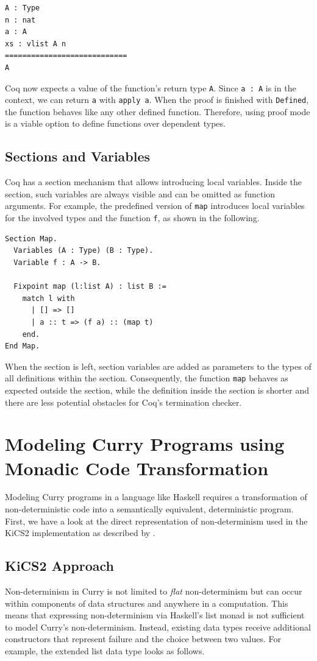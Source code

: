 \documentclass[a4paper, 11pt, fleqn, twoside]{scrreprt}
\newcommand{\cinl}[1]{\texttt{#1}}
\begin{document}
\begin{verbatim}
A : Type
n : nat
a : A
xs : vlist A n
============================
A
\end{verbatim}

Coq now expects a value of the function's return type \cinl{A}.
Since \cinl{a : A} is in the context, we can return \cinl{a} with \cinl{apply a}.
When the proof is finished with \cinl{Defined}, the function behaves like any other defined function.
Therefore, using proof mode is a viable option to define functions over dependent types.

\subsection{Sections and Variables}
Coq has a section mechanism that allows introducing local variables.
Inside the section, such variables are always visible and can be omitted as function arguments.
For example, the predefined version of \cinl{map} introduces local variables for the involved types and the function \cinl{f}, as shown in the following.

\begin{verbatim}
Section Map.
  Variables (A : Type) (B : Type).
  Variable f : A -> B.

  Fixpoint map (l:list A) : list B :=
    match l with
      | [] => []
      | a :: t => (f a) :: (map t)
    end.
End Map.
\end{verbatim}

When the section is left, section variables are added as parameters to the types of all definitions within the section.
Consequently, the function \cinl{map} behaves as expected outside the section, while the definition inside the section is shorter and there are less potential obstacles for Coq's termination checker.

\section{Modeling Curry Programs using Monadic Code Transformation}

Modeling Curry programs in a language like Haskell requires a transformation of non-deterministic code into a semantically equivalent, deterministic program.
First, we have a look at the direct representation of non-determinism used in the KiCS2 implementation as described by \citet{brassel2011kics2}.

\subsection{KiCS2 Approach}
Non-determinism in Curry is not limited to \textit{flat} non-determinism but can occur within components of data structures and anywhere in a computation.
This means that expressing non-determinism via Haskell's list monad is not sufficient to model Curry's non-determinism.
Instead, existing data types receive additional constructors that represent failure and the choice between two values.
For example, the extended list data type looks as follows.
\end{document}
